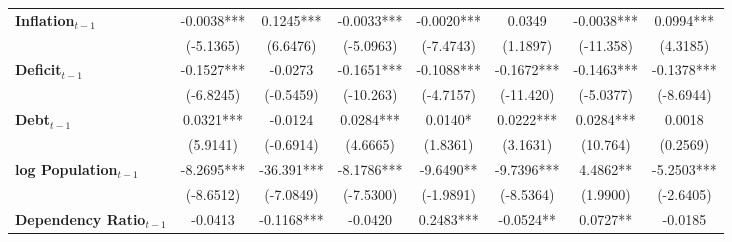 \begin{center}
\begin{tabular}{lccccccc}
\textbf{Inflation$_{t-1}$}      &      -0.0038***      &          0.1245***          &          -0.0033***          &              -0.0020***             &              0.0349              &          -0.0038***         &           0.0994***            \\
\textbf{ }                         &      (-5.1365)       &           (6.6476)          &          (-5.0963)           &              (-7.4743)              &             (1.1897)             &          (-11.358)          &            (4.3185)            \\
\textbf{Deficit$_{t-1}$}             &      -0.1527***      &           -0.0273           &          -0.1651***          &              -0.1088***             &            -0.1672***            &          -0.1463***         &           -0.1378***           \\
\textbf{ }                         &      (-6.8245)       &          (-0.5459)          &          (-10.263)           &              (-4.7157)              &            (-11.420)             &          (-5.0377)          &           (-8.6944)            \\
\textbf{Debt$_{t-1}$}                &      0.0321***       &           -0.0124           &          0.0284***           &               0.0140*               &            0.0222***             &          0.0284***          &             0.0018             \\
\textbf{ }                         &       (5.9141)       &          (-0.6914)          &           (4.6665)           &               (1.8361)              &             (3.1631)             &           (10.764)          &            (0.2569)            \\
\textbf{log Population$_{t-1}$}      &      -8.2695***      &          -36.391***         &          -8.1786***          &              -9.6490**              &            -9.7396***            &           4.4862**          &           -5.2503***           \\
\textbf{ }                         &      (-8.6512)       &          (-7.0849)          &          (-7.5300)           &              (-1.9891)              &            (-8.5364)             &           (1.9900)          &           (-2.6405)            \\
\textbf{Dependency Ratio$_{t-1}$}   &       -0.0413        &          -0.1168***         &           -0.0420            &              0.2483***              &            -0.0524**             &           0.0727**          &            -0.0185             \\

\end{tabular}
\end{center}
